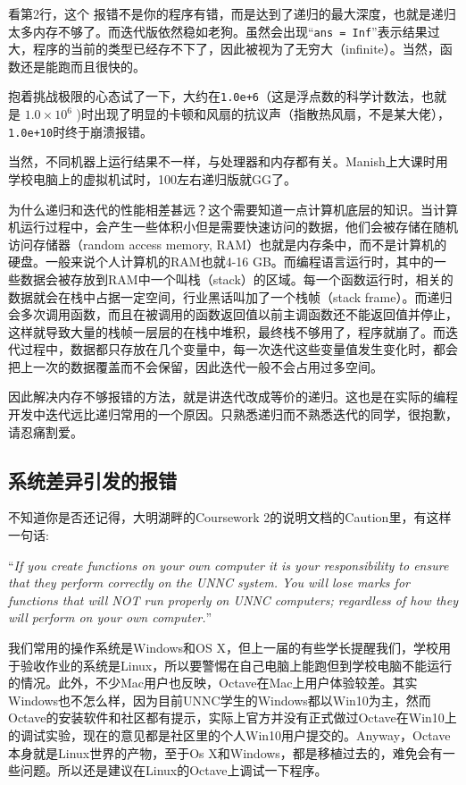 \documentclass[12pt]{article}
\begin{document}
\begin{spacing}{1.4}
看第2行，这个 报错不是你的程序有错，而是达到了递归的最大深度，也就是递归太多内存不够了。而迭代版依然稳如老狗。虽然会出现“\texttt{ans = Inf}”表示结果过大，程序的当前的类型已经存不下了，因此被视为了无穷大（infinite）。当然，函数还是能跑而且很快的。

抱着挑战极限的心态试了一下，大约在\texttt{1.0e+6}（这是浮点数的科学计数法，也就是 $\textrm{1.0} \times \textrm{10} ^{\textrm{6}} $ )时出现了明显的卡顿和风扇的抗议声（指散热风扇，不是某大佬），\texttt{1.0e+10}时终于崩溃报错。

当然，不同机器上运行结果不一样，与处理器和内存都有关。Manish上大课时用学校电脑上的虚拟机试时，100左右递归版就GG了。

为什么递归和迭代的性能相差甚远？这个需要知道一点计算机底层的知识。当计算机运行过程中，会产生一些体积小但是需要快速访问的数据，他们会被存储在随机访问存储器（random access memory, RAM）也就是内存条中，而不是计算机的硬盘。一般来说个人计算机的RAM也就4-16 GB。而编程语言运行时，其中的一些数据会被存放到RAM中一个叫栈（stack）的区域。每一个函数运行时，相关的数据就会在栈中占据一定空间，行业黑话叫加了一个栈帧（stack frame）。而递归会多次调用函数，而且在被调用的函数返回值以前主调函数还不能返回值并停止，这样就导致大量的栈帧一层层的在栈中堆积，最终栈不够用了，程序就崩了。而迭代过程中，数据都只存放在几个变量中，每一次迭代这些变量值发生变化时，都会把上一次的数据覆盖而不会保留，因此迭代一般不会占用过多空间。

因此解决内存不够报错的方法，就是讲迭代改成等价的递归。这也是在实际的编程开发中迭代远比递归常用的一个原因。只熟悉递归而不熟悉迭代的同学，很抱歉，请忍痛割爱。

\subsection{系统差异引发的报错}

不知道你是否还记得，大明湖畔的Coursework 2的说明文档的Caution里，有这样一句话:

“\textit{If you create functions on your own computer it is your responsibility to ensure that they perform correctly on the UNNC system. You will lose marks for functions that will NOT run properly on UNNC computers; regardless of how they will perform on your own computer.}”

我们常用的操作系统是Windows和OS X，但上一届的有些学长提醒我们，学校用于验收作业的系统是Linux，所以要警惕在自己电脑上能跑但到学校电脑不能运行的情况。此外，不少Mac用户也反映，Octave在Mac上用户体验较差。其实Windows也不怎么样，因为目前UNNC学生的Windows都以Win10为主，然而Octave的安装软件和社区都有提示，实际上官方并没有正式做过Octave在Win10上的调试实验，现在的意见都是社区里的个人Win10用户提交的。Anyway，Octave本身就是Linux世界的产物，至于Os X和Windows，都是移植过去的，难免会有一些问题。所以还是建议在Linux的Octave上调试一下程序。


\end{spacing}
\end{document}
